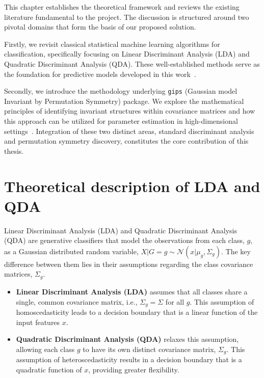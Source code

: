 \documentclass[a4paper,11pt,twoside]{report}
\theoremstyle{definition}
\begin{document}
This chapter establishes the theoretical framework and reviews the existing literature fundamental to the project.
The discussion is structured around two pivotal domains that form the basis of our proposed solution.

Firstly, we revisit classical statistical machine learning algorithms for classification, specifically focusing on Linear Discriminant Analysis (LDA) and Quadratic Discriminant Analysis (QDA).
These well-established methods serve as the foundation for predictive models developed in this work~\cite{elemstats}.

Secondly, we introduce the methodology underlying \texttt{gips} (Gaussian model Invariant by Permutation Symmetry) package.
We explore the mathematical principles of identifying invariant structures within covariance matrices and how this approach can be utilized for parameter estimation in high-dimensional settings~\cite{JSSv112i07}.
Integration of these two distinct areas, standard discriminant analysis and permutation symmetry discovery, constitutes the core contribution of this thesis.

\section{Theoretical description of LDA and QDA}

Linear Discriminant Analysis (LDA) and Quadratic Discriminant Analysis (QDA) are generative classifiers that model the observations from each class, $g$, as a Gaussian distributed random variable, $X|G = g \sim \mathcal{N}(x | \mu_g, \Sigma_g)$. The key difference between them lies in their assumptions regarding the class covariance matrices, $\Sigma_g$.

\begin{itemize}
    \item \textbf{Linear Discriminant Analysis (LDA)} assumes that all classes share a single, common covariance matrix, i.e., $\Sigma_g = \Sigma$ for all $g$. This assumption of homoscedasticity leads to a decision boundary that is a linear function of the input features $x$.
    \item \textbf{Quadratic Discriminant Analysis (QDA)} relaxes this assumption, allowing each class $g$ to have its own distinct covariance matrix, $\Sigma_g$. This assumption of heteroscedasticity results in a decision boundary that is a quadratic function of $x$, providing greater flexibility.
\end{itemize}
\end{document}
